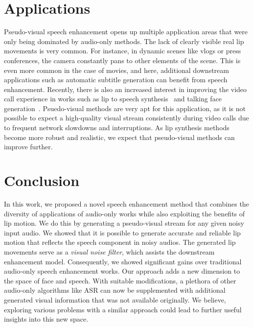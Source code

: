 \documentclass[10pt,twocolumn,letterpaper]{article}
\begin{document}
\vspace{-10pt}
\section{Applications}
\label{section:applications}
Pseudo-visual speech enhancement opens up multiple application areas that were only being dominated by audio-only methods. The lack of clearly visible real lip movements is very common. For instance, in dynamic scenes like vlogs or press conferences, the camera constantly pans to other elements of the scene. This is even more common in the case of movies, and here, additional downstream applications such as automatic subtitle generation can benefit from speech enhancement. Recently, there is also an increased interest in improving the video call experience in works such as lip to speech synthesis~\cite{Prajwal_2020_CVPR} and talking face generation~\cite{wav2lip:2020}. Psuedo-visual methods are very apt for this application, as it is not possible to expect a high-quality visual stream consistently during video calls due to frequent network slowdowns and interruptions. As lip synthesis methods become more robust and realistic, we expect that pseudo-visual methods can improve further.

\section{Conclusion}
\label{section:conclusion}
In this work, we proposed a novel speech enhancement method that combines the diversity of applications of audio-only works while also exploiting the benefits of lip motion. We do this by generating a pseudo-visual stream for any given noisy input audio. We showed that it is possible to generate accurate and reliable lip motion that reflects the speech component in noisy audios. The generated lip movements serve as a \textit{visual noise filter}, which assists the downstream enhancement model. Consequently, we showed significant gains over traditional audio-only speech enhancement works. Our approach adds a new dimension to the space of face and speech. With suitable modifications, a plethora of other audio-only algorithms like ASR can now be supplemented with additional generated visual information that was not available originally. We believe, exploring various problems with a similar approach could lead to further useful insights into this new space.

{\small


}
\end{document}
